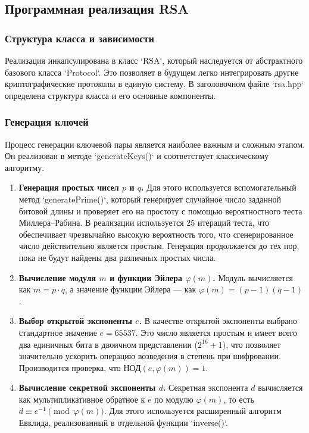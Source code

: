 \subsection{Программная реализация RSA}

\subsubsection{Структура класса и зависимости}
Реализация инкапсулирована в класс `RSA`, который наследуется от абстрактного базового класса `Protocol`. Это позволяет в будущем легко интегрировать другие криптографические протоколы в единую систему. В заголовочном файле `rsa.hpp` определена структура класса и его основные компоненты.



\subsubsection{Генерация ключей}
Процесс генерации ключевой пары является наиболее важным и сложным этапом. Он реализован в методе `generateKeys()` и соответствует классическому алгоритму.

\begin{enumerate}
    \item \textbf{Генерация простых чисел $p$ и $q$.} Для этого используется вспомогательный метод `generatePrime()`, который генерирует случайное число заданной битовой длины и проверяет его на простоту с помощью вероятностного теста Миллера–Рабина. В реализации используется 25 итераций теста, что обеспечивает чрезвычайно высокую вероятность того, что сгенерированное число действительно является простым. Генерация продолжается до тех пор, пока не будут найдены два различных простых числа.
    
    \item \textbf{Вычисление модуля $m$ и функции Эйлера $\varphi(m)$.} Модуль вычисляется как $m = p \cdot q$, а значение функции Эйлера — как $\varphi(m) = (p-1)(q-1)$.
    
    \item \textbf{Выбор открытой экспоненты $e$.} В качестве открытой экспоненты выбрано стандартное значение $e = 65537$. Это число является простым и имеет всего два единичных бита в двоичном представлении ($2^{16}+1$), что позволяет значительно ускорить операцию возведения в степень при шифровании. Производится проверка, что $\text{НОД}(e, \varphi(m))=1$.
    
    \item \textbf{Вычисление секретной экспоненты $d$.} Секретная экспонента $d$ вычисляется как мультипликативное обратное к $e$ по модулю $\varphi(m)$, то есть $d \equiv e^{-1} \pmod{\varphi(m)}$. Для этого используется расширенный алгоритм Евклида, реализованный в отдельной функции `inverse()`.
\end{enumerate}

